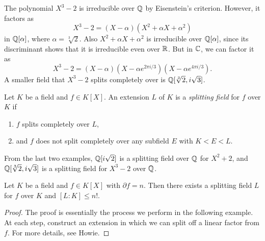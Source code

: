 \begin{example}
  The polynomial $X^3 - 2$ is irreducible
  over $\mathbb{Q}$ by Eisenstein's criterion. However,
  it factors as
  \[
    X^3 - 2 = (X - \alpha) (X^2 + \alpha X + \alpha^2)
  \]
  in $\mathbb{Q}[\alpha]$, where $\alpha = \sqrt[3]{2}$.
  Also $X^2 + \alpha X + \alpha^2$ is irreducible
  over $\mathbb{Q}[\alpha]$, since its discriminant shows that
  it is irreducible even over $\mathbb{R}$. But in $\mathbb{C}$, we
  can factor it as
  \[
    X^3 - 2 = (X - \alpha)(X - \alpha e^{2\pi i / 3})(X - \alpha e^{4\pi i / 3}).
  \]
  A smaller field that $X^3 - 2$ splits completely over
  is $\mathbb{Q}[\sqrt[3]{2}, i \sqrt{3}]$.
\end{example}

\begin{definition}
  Let $K$ be a field and $f \in K[X]$. An extension
  $L$ of $K$ is a \emph{splitting field} for $f$ over $K$
  if
  \begin{enumerate}
    \item $f$ splits completely over $L$,
    \item and $f$ does not split completely over any
      subfield $E$ with $K < E < L$.
  \end{enumerate}
\end{definition}

\begin{example}
  From the last two examples, $\mathbb{Q}[i\sqrt{2}]$ is a
  splitting field over $\mathbb{Q}$ for $X^2 + 2$, and $\mathbb{Q}[\sqrt[3]{2}, i\sqrt{3}]$
  is a splitting field for $X^3 - 2$ over $\mathbb{Q}$.
\end{example}

\begin{theorem}
  Let $K$ be a field and $f \in K[X]$ with
  $\partial f = n$. Then there exists a splitting field
  $L$ for $f$ over $K$ and $[L : K] \le n!$.
\end{theorem}

\begin{proof}
The proof is essentially the process we perform in the
following example. At each step, construct an extension
in which we can split off a linear factor from $f$.
For more details, see Howie.
\end{proof}

